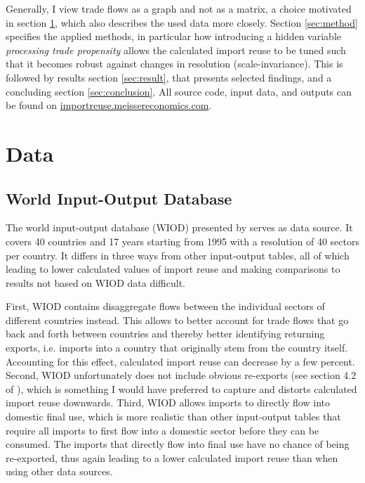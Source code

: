 \documentclass[english]{uzhpub}
\begin{document}
Generally, I view trade flows as a graph and not as a matrix, a choice motivated in section \ref{sec:data}, which also describes the used data more closely. Section \ref{sec:method} specifies the applied methods, in particular how introducing a hidden variable \emph{processing trade propensity} allows the calculated import reuse to be tuned such that it becomes robust against changes in resolution (scale-invariance). This is followed by results section \ref{sec:result}, that presents selected findings, and a concluding section \ref{sec:conclusion}. All source code, input data, and outputs can be found on \href{http://importreuse.meissereconomics.com}{importreuse.meissereconomics.com}.

\section{Data} \label{sec:data}
\subsection{World Input-Output Database}
The world input-output database (WIOD) presented by \cite{timmer2012world} serves as data source. It covers 40 countries and 17 years starting from 1995 with a resolution of 40 sectors per country. It differs in three ways from other input-output tables, all of which leading to lower calculated values of import reuse and making comparisons to results not based on WIOD data difficult.

First, WIOD contains disaggregate flows between the individual sectors of different countries instead. This allows to better account for trade flows that go back and forth between countries and thereby better identifying returning exports, i.e. imports into a country that originally stem from the country itself. Accounting for this effect, calculated import reuse can decrease by a few percent. Second, WIOD unfortunately does not include obvious re-exports (see section 4.2 of \cite{dietzenbacher2013construction}), which is something I would have preferred to capture and distorts calculated import reuse downwards. Third, WIOD allows imports to directly flow into domestic final use, which is more realistic than other input-output tables that require all imports to first flow into a domestic sector before they can be consumed. The imports that directly flow into final use have no chance of being re-exported, thus again leading to a lower calculated import reuse than when using other data sources.
\end{document}
